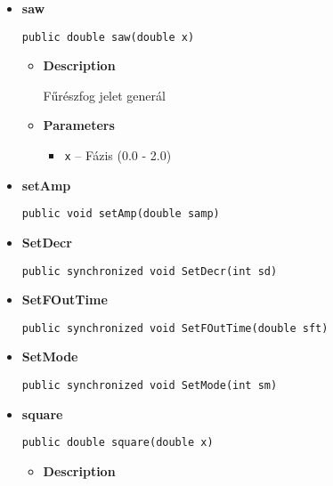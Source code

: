 {{{{{{{{{{{{{{\begin{itemize}
{\begin{itemize}
{Gyökös csillapodás
}
\item{
{\bf  Parameters}
  \begin{itemize}
   \item{
\texttt{cet} -- A csillapodási fázisban eltöltött idő}
  \end{itemize}
}%
\end{itemize}
}%
\item{ 
\hypertarget{main.OSC.saw(double)}{{\bf  saw}\\}
\begin{lstlisting}[frame=none]
public double saw(double x)\end{lstlisting} %
\begin{itemize}
\item{
{\bf  Description}

Fűrészfog jelet generál
}
\item{
{\bf  Parameters}
  \begin{itemize}
   \item{
\texttt{x} -- Fázis (0.0 - 2.0)}
  \end{itemize}
}%
\end{itemize}
}%
\item{ 
\hypertarget{main.OSC.setAmp(double)}{{\bf  setAmp}\\}
\begin{lstlisting}[frame=none]
public void setAmp(double samp)\end{lstlisting} %
}%
\item{ 
\hypertarget{main.OSC.SetDecr(int)}{{\bf  SetDecr}\\}
\begin{lstlisting}[frame=none]
public synchronized void SetDecr(int sd)\end{lstlisting} %
}%
\item{ 
\hypertarget{main.OSC.SetFOutTime(double)}{{\bf  SetFOutTime}\\}
\begin{lstlisting}[frame=none]
public synchronized void SetFOutTime(double sft)\end{lstlisting} %
}%
\item{ 
\hypertarget{main.OSC.SetMode(int)}{{\bf  SetMode}\\}
\begin{lstlisting}[frame=none]
public synchronized void SetMode(int sm)\end{lstlisting} %
}%
\item{ 
\hypertarget{main.OSC.square(double)}{{\bf  square}\\}
\begin{lstlisting}[frame=none]
public double square(double x)\end{lstlisting} %
\begin{itemize}
\item{
{\bf  Description}

}
\end{itemize}}
\end{itemize}}}}}}}}}}}}}}}
